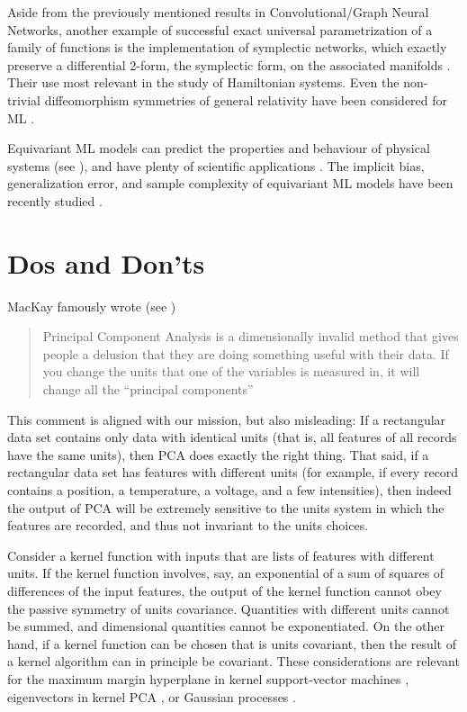 \documentclass[]{article} %
\begin{document}
Aside from the previously mentioned results in Convolutional/Graph Neural Networks, another example of successful exact universal parametrization of a family of functions is the implementation of symplectic networks, which exactly preserve a differential 2-form, the symplectic form, on the associated manifolds \citep{sympnets,henonnets}. Their use most relevant in the study of Hamiltonian systems. Even the non-trivial diffeomorphism symmetries of general relativity have been considered for ML \citep{weiler}.
 
Equivariant ML models can predict the properties and behaviour of physical systems (see \citealt{cheng2019covariance}), and have plenty of scientific applications \citep{batzner20223, musaelian2022learning, stark2022equibind, yu-physics, wang2022approximately}. The implicit bias, generalization error, and sample complexity of equivariant ML models have been recently studied \citep{petrache2023approximation,lawrence2021implicit, bietti2021sample, elesedy2021provably, elesedy2021kernel, mei2021learning}.

\section{Dos and Don'ts}\label{sec:dos}
MacKay famously wrote (see \citealt{muldoonmedium})
\begin{quote}Principal Component Analysis is a dimensionally invalid method that gives people a delusion that they are doing something useful with their data. If you change the units that one of the variables is measured in, it will change all the ``principal components''\end{quote}
This comment is aligned with our mission, but also misleading: If a rectangular data set contains only data with identical units (that is, all features of all records have the same units), then PCA does exactly the right thing.
That said, if a rectangular data set has features with different units (for example, if every record contains a position, a temperature, a voltage, and a few intensities), then indeed the output of PCA will be extremely sensitive to the units system in which the features are recorded, and thus not invariant to the units choices.

Consider a kernel function with inputs that are lists of features with different units.
If the kernel function involves, say, an exponential of a sum of squares of differences of the input features, the output of the kernel function cannot obey the passive symmetry of units covariance.
Quantities with different units cannot be summed, and dimensional quantities cannot be exponentiated. 
On the other hand, if a kernel function can be chosen that is units covariant, then the result of a kernel algorithm can in principle be covariant.
These considerations are relevant for the maximum margin hyperplane in kernel support-vector machines \citep{ksvm}, eigenvectors in kernel PCA \citep{SchSmo02}, or Gaussian processes \citep{gpml}.
\end{document}
